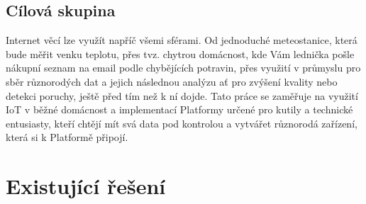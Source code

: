 \documentclass[thesis=B,czech]{FITthesis}[2019/12/23]
\begin{document}
\subsection{Cílová skupina}
Internet věcí lze využít napříč všemi sférami. Od jednoduché meteostanice, která bude měřit venku teplotu, přes tvz. chytrou domácnost, kde Vám lednička pošle nákupní seznam na email podle chybějících potravin, přes využití v průmyslu pro sběr různorodých dat a jejich následnou analýzu ať pro zvýšení kvality nebo detekci poruchy, ještě před tím než k ní dojde. Tato práce se zaměřuje na využití IoT v běžné domácnost a implementací Platformy určené pro kutily a technické entusiasty, kteří chtějí mít svá data pod kontrolou a vytvářet různorodá zařízení, která si k Platformě připojí.






\section{Existující řešení}
\end{document}
